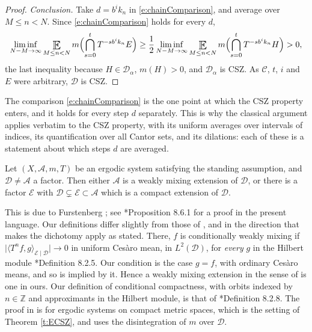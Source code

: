 \begin{proof}
\emph{Conclusion.}  Take $d = b ^{i}k_n$ in \eqref{e:chainComparison}, and average over $M \leq n < N$.  Since \eqref{e:chainComparison} holds for every $d$, 
\begin{equation}
\liminf_{N-M\to\infty} \Expectation_{M\leq n<N} m \Bigl( \bigcap_{s=0}^t T ^{-sb ^{i}k_n}E \Bigr) 
\geq \frac 12 \liminf_{N-M\to\infty} \Expectation_{M\leq n<N} m \Bigl( \bigcap_{s=0}^t T ^{-sb ^{i}k_n}H \Bigr) > 0 , 
\end{equation}
the last inequality because $H \in \mathcal D_\alpha$, $m(H)>0$, and $\mathcal D_\alpha$ is CSZ.  As $\mathcal C$, $t$, $i$ and $E$ were arbitrary, $\mathcal D$ is CSZ.  
\end{proof}

The comparison \eqref{e:chainComparison} is the one point at which the CSZ property enters, and it holds for every step $d$ separately.  
This is why the classical argument applies verbatim to the CSZ property, with its uniform averages over intervals of indices, 
its quantification over all Cantor sets, and its dilations: each of these is a statement about which steps $d$ are averaged.  

\begin{lemma}[Dichotomy] \label{l:dichotomy}
Let $(X,\mathcal A,m,T)$ be an ergodic system satisfying the standing assumption, and $\mathcal D \neq \mathcal A$ a factor.  
Then either $\mathcal A$ is a weakly mixing extension of $\mathcal D$, or there is a factor $\mathcal E$ with $\mathcal D \subsetneq \mathcal E \subset \mathcal A$ 
which is a compact extension of $\mathcal D$.  
\end{lemma}

This is due to Furstenberg \cite{MR0498471}; see \cite{MoreiraNotes}*{Proposition 8.6.1} for a proof in the present language.  
Our definitions differ slightly from those of \cite{MoreiraNotes}, and in the direction that makes the dichotomy apply as stated.  
There, $f$ is conditionally weakly mixing if $\lvert \langle T^nf,g\rangle_{\mathcal E\mid \mathcal D}\rvert \to 0$ in uniform Ces\`aro mean, in $L^2(\mathcal D)$, 
for \emph{every} $g$ in the Hilbert module \cite{MoreiraNotes}*{Definition 8.2.5}.  Our condition is the case $g=f$, with ordinary Ces\`aro means, and so is implied by it.  
Hence a weakly mixing extension in the sense of \cite{MoreiraNotes} is one in ours.  
Our definition of conditional compactness, with orbits indexed by $n \in \mathbb Z$ and approximants in the Hilbert module, is that of \cite{MoreiraNotes}*{Definition 8.2.8}.  
The proof in \cite{MoreiraNotes} is for ergodic systems on compact metric spaces, which is the setting of Theorem \ref{t:ECSZ}, and uses the disintegration of $m$ over $\mathcal D$.  

